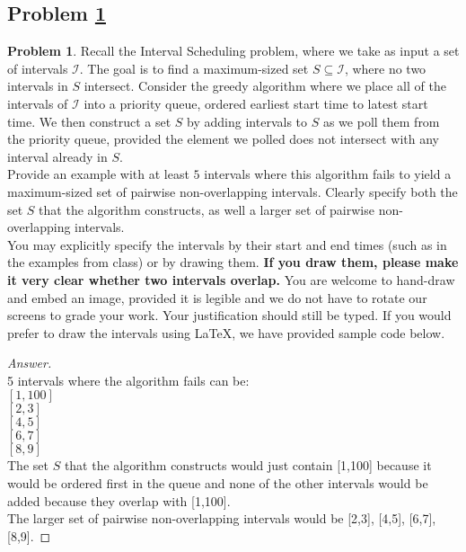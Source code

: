 \documentclass[11pt]{article}
\theoremstyle{definition}
\theoremstyle{definition}
\newtheorem{required}{Problem}
\theoremstyle{definition}
\newcommand{\interval}[4]{\draw (#2, #1) -- (#3, #1); %
\draw (#2, #1-0.11) -- (#2, #1+0.11); %
\draw (#3, #1-0.11) -- (#3, #1+0.11); %
\node[] at (#2-0.25, #1) {#4};
}
\begin{document}
\subsection{Problem \ref{GreedyFail1}}
\begin{required} \label{GreedyFail1}
Recall the \textsf{Interval Scheduling} problem, where we take as input a set of intervals $\mathcal{I}$. The goal is to find a maximum-sized set $S \subseteq \mathcal{I}$, where no two intervals in $S$ intersect. Consider the greedy algorithm where we place all of the intervals of $\mathcal{I}$ into a priority queue, ordered earliest start time to latest start time. We then construct a set $S$ by adding intervals to $S$ as we poll them from the priority queue, provided the element we polled does not intersect with any interval already in $S$. \\

\noindent Provide an example with at least $5$ intervals where this algorithm fails to yield a maximum-sized set of pairwise non-overlapping intervals. Clearly specify both the set $S$ that the algorithm constructs, as well a larger set of pairwise non-overlapping intervals. \\

\noindent You may explicitly specify the intervals by their start and end times (such as in the examples from class) or by drawing them. \textbf{If you draw them, please make it very clear whether two intervals overlap.} You are welcome to hand-draw and embed an image, provided it is legible and we do not have to rotate our screens to grade your work. Your justification should still be typed. If you would prefer to draw the intervals using \LaTeX, we have provided sample code below.
\end{required}



\begin{proof}[Answer]
\\
5 intervals where the algorithm fails can be: \\
$[1,100]$ \\
$[2,3]$ \\
$[4,5]$ \\
$[6,7]$ \\
$[8,9]$ \\
The set $S$ that the algorithm constructs would just contain [1,100] because it would be ordered first in the queue and none of the other intervals would be added because they overlap with [1,100]. \\
The larger set of pairwise non-overlapping intervals would be {[2,3], [4,5], [6,7], [8,9]}.
\end{proof}
\end{document}
